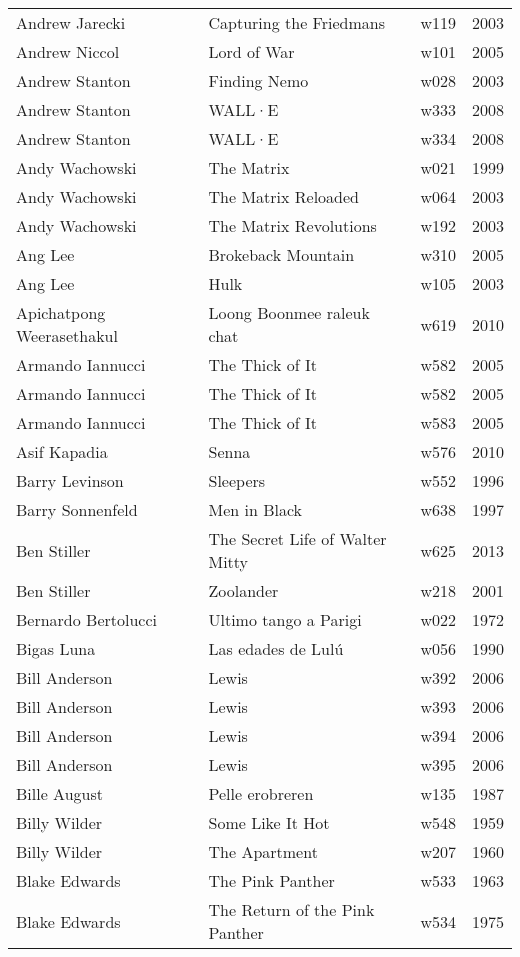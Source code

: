 \documentclass{article}
\begin{document}
\begin {center}
\begin{longtable}{l p{10cm} l l}
Andrew Jarecki & Capturing the Friedmans & w119 & 2003 \\
Andrew Niccol & Lord of War & w101 & 2005 \\
Andrew Stanton & Finding Nemo & w028 & 2003 \\
Andrew Stanton & WALL·E & w333 & 2008 \\
Andrew Stanton & WALL·E & w334 & 2008 \\
Andy Wachowski & The Matrix & w021 & 1999 \\
Andy Wachowski & The Matrix Reloaded & w064 & 2003 \\
Andy Wachowski & The Matrix Revolutions & w192 & 2003 \\
Ang Lee & Brokeback Mountain & w310 & 2005 \\
Ang Lee & Hulk & w105 & 2003 \\
Apichatpong Weerasethakul & Loong Boonmee raleuk chat & w619 & 2010 \\
Armando Iannucci & The Thick of It & w582 & 2005 \\
Armando Iannucci & The Thick of It & w582 & 2005 \\
Armando Iannucci & The Thick of It & w583 & 2005 \\
Asif Kapadia & Senna & w576 & 2010 \\
Barry Levinson & Sleepers & w552 & 1996 \\
Barry Sonnenfeld & Men in Black & w638 & 1997 \\
Ben Stiller & The Secret Life of Walter Mitty & w625 & 2013 \\
Ben Stiller & Zoolander & w218 & 2001 \\
Bernardo Bertolucci & Ultimo tango a Parigi & w022 & 1972 \\
Bigas Luna & Las edades de Lulú & w056 & 1990 \\
Bill Anderson & Lewis & w392 & 2006 \\
Bill Anderson & Lewis & w393 & 2006 \\
Bill Anderson & Lewis & w394 & 2006 \\
Bill Anderson & Lewis & w395 & 2006 \\
Bille August & Pelle erobreren & w135 & 1987 \\
Billy Wilder & Some Like It Hot & w548 & 1959 \\
Billy Wilder & The Apartment & w207 & 1960 \\
Blake Edwards & The Pink Panther & w533 & 1963 \\
Blake Edwards & The Return of the Pink Panther & w534 & 1975 \\

\end{longtable}
\end{center}
\end{document}
